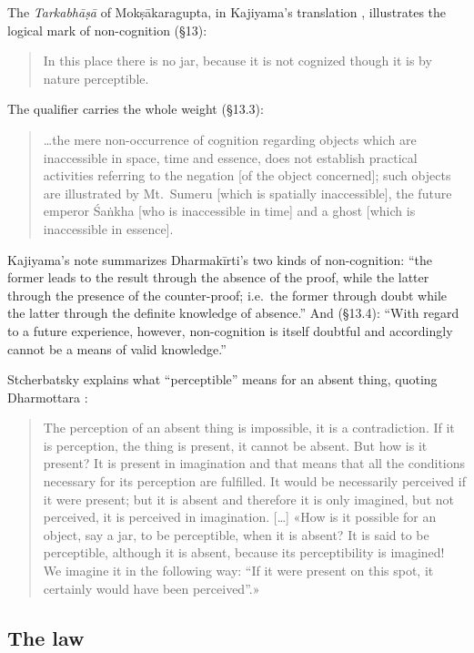 \documentclass[11pt]{article}
\theoremstyle{plain}
\theoremstyle{definition}
\begin{document}
The \emph{Tarkabhāṣā} of Mokṣākaragupta, in Kajiyama's translation \cite{Kajiyama1966},
illustrates the logical mark of non-cognition (§13):

\begin{quote}
In this place there is no jar, because it is not cognized though it is by nature
perceptible.
\end{quote}

\noindent The qualifier carries the whole weight (§13.3):

\begin{quote}
\ldots the mere non-occurrence of cognition regarding objects which are inaccessible in
space, time and essence, does not establish practical activities referring to the negation
[of the object concerned]; such objects are illustrated by Mt.~Sumeru [which is spatially
inaccessible], the future emperor Śaṅkha [who is inaccessible in time] and a ghost [which is
inaccessible in essence].
\end{quote}

\noindent Kajiyama's note summarizes Dharmakīrti's two kinds of non-cognition: ``the former
leads to the result through the absence of the proof, while the latter through the presence
of the counter-proof; i.e.\ the former through doubt while the latter through the definite
knowledge of absence.'' And (§13.4): ``With regard to a future experience, however,
non-cognition is itself doubtful and accordingly cannot be a means of valid knowledge.''

Stcherbatsky explains what ``perceptible'' means for an absent thing, quoting Dharmottara
\cite[p.~365]{Stcherbatsky1932}:

\begin{quote}
The perception of an absent thing is impossible, it is a contradiction. If it is perception,
the thing is present, it cannot be absent. But how is it present? It is present in
imagination and that means that all the conditions necessary for its perception are
fulfilled. It would be necessarily perceived if it were present; but it is absent and
therefore it is only imagined, but not perceived, it is perceived in imagination. [\ldots]
«How is it possible for an object, say a jar, to be perceptible, when it is absent? It is
said to be perceptible, although it is absent, because its perceptibility is imagined! We
imagine it in the following way: ``If it were present on this spot, it certainly would have
been perceived''.»
\end{quote}

\subsection{The law}
\end{document}
